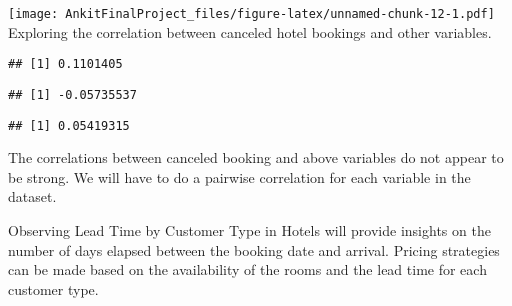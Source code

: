 \documentclass[
]{article}
\newenvironment{Shaded}{\begin{snugshade}}{\end{snugshade}}
\newcommand{\FunctionTok}[1]{\textcolor[rgb]{0.00,0.00,0.00}{#1}}
\newcommand{\NormalTok}[1]{#1}
\newcommand{\SpecialCharTok}[1]{\textcolor[rgb]{0.00,0.00,0.00}{#1}}
\begin{document}
\texttt{[image: AnkitFinalProject\_files/figure-latex/unnamed-chunk-12-1.pdf]}
Exploring the correlation between canceled hotel bookings and other
variables.

\begin{Shaded}
\end{Shaded}

\begin{verbatim}
## [1] 0.1101405
\end{verbatim}

\begin{Shaded}
\end{Shaded}

\begin{verbatim}
## [1] -0.05735537
\end{verbatim}

\begin{Shaded}
\end{Shaded}

\begin{verbatim}
## [1] 0.05419315
\end{verbatim}

The correlations between canceled booking and above variables do not
appear to be strong. We will have to do a pairwise correlation for each
variable in the dataset.

Observing Lead Time by Customer Type in Hotels will provide insights on
the number of days elapsed between the booking date and arrival. Pricing
strategies can be made based on the availability of the rooms and the
lead time for each customer type.
\end{document}
